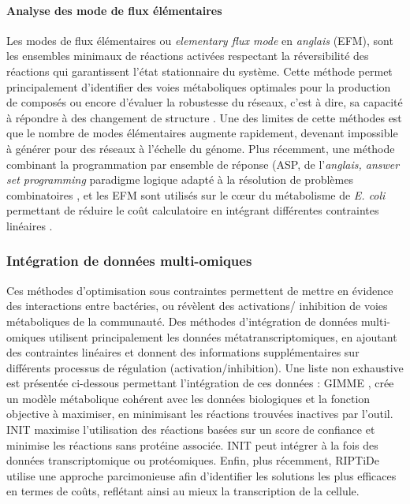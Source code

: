 \documentclass[../main.tex]{subfiles}
\begin{document}
\paragraph*{Analyse des mode de flux élémentaires}
Les modes de flux élémentaires ou \textit{elementary flux mode} en \textit{anglais} (EFM), sont les ensembles minimaux de réactions activées respectant la réversibilité des réactions qui garantissent l'état stationnaire du système\citep{SCHUSTER1994, Trinh2009}. Cette méthode permet principalement d'identifier des voies métaboliques optimales pour la production de composés ou encore d'évaluer la robustesse du réseaux, c'est à dire, sa capacité à répondre à des changement de structure \citep{Klamt2002}. Une des limites de cette méthodes est que le nombre de modes élémentaires augmente rapidement, devenant impossible à générer pour des réseaux à l'échelle du génome. Plus récemment, une méthode combinant la programmation par ensemble de réponse (ASP, de l'\textit{anglais, answer set programming} paradigme logique adapté à la résolution de problèmes combinatoires \citep{Lifschitz2008}, et les EFM sont utilisés sur le c\oe{}ur du métabolisme de \textit{E. coli} permettant de réduire le coût calculatoire en intégrant différentes contraintes linéaires \citep{Mahout2020}.


\subsubsection{Intégration de données multi-omiques}
Ces méthodes d'optimisation sous contraintes permettent de mettre en évidence des interactions entre bactéries, ou révèlent des activations/ inhibition de voies métaboliques de la communauté. Des méthodes d'intégration de données multi-omiques utilisent principalement les données métatranscriptomiques, en ajoutant des contraintes linéaires et donnent des informations  supplémentaires sur différents processus de régulation (activation/inhibition). Une liste non exhaustive est présentée ci-dessous permettant l'intégration de ces données : GIMME \citep{Becker2008}, crée un modèle métabolique cohérent avec les données biologiques et la fonction objective à maximiser, en minimisant les réactions trouvées inactives par l'outil. INIT \citep{Agren2012} maximise l'utilisation des réactions basées sur un score de confiance et minimise les réactions sans protéine associée.  INIT peut intégrer à la fois des données transcriptomique ou protéomiques. Enfin, plus récemment, RIPTiDe \citep{Jenior2020} utilise une approche parcimonieuse afin d'identifier les solutions les plus efficaces en termes de coûts, reflétant ainsi au mieux la transcription de la cellule.
\end{document}
